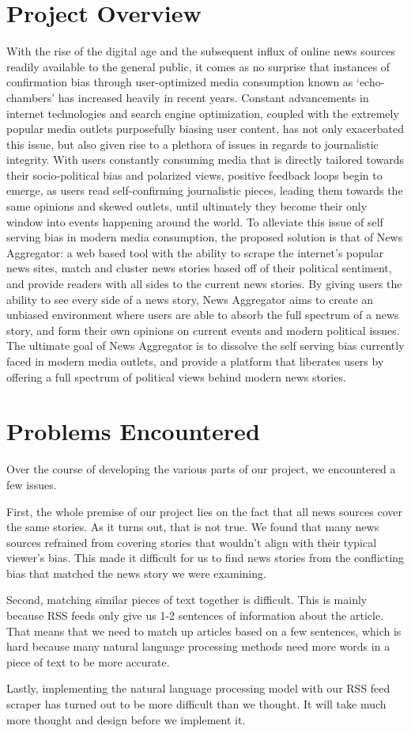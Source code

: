\documentclass[onecolumn, draftclsnofoot,10pt, compsoc]{IEEEtran}
\begin{document}
\section{Project Overview}
With the rise of the digital age and the subsequent influx of online news sources readily available to the general
public, it comes as no surprise that instances of confirmation bias through user-optimized media consumption known
as ‘echo-chambers’ has increased heavily in recent years. Constant advancements in internet technologies and search
engine optimization, coupled with the extremely popular media outlets purposefully biasing user content, has not only
exacerbated this issue, but also given rise to a plethora of issues in regards to journalistic integrity. With users constantly
consuming media that is directly tailored towards their socio-political bias and polarized views, positive feedback loops
begin to emerge, as users read self-confirming journalistic pieces, leading them towards the same opinions and skewed
outlets, until ultimately they become their only window into events happening around the world. To alleviate this issue
of self serving bias in modern media consumption, the proposed solution is that of News Aggregator: a web based tool
with the ability to scrape the internet’s popular news sites, match and cluster news stories based off of their political
sentiment, and provide readers with all sides to the current news stories. By giving users the ability to see every side of
a news story, News Aggregator aims to create an unbiased environment where users are able to absorb the full spectrum
of a news story, and form their own opinions on current events and modern political issues. The ultimate goal of News
Aggregator is to dissolve the self serving bias currently faced in modern media outlets, and provide a platform that
liberates users by offering a full spectrum of political views behind modern news stories.

\section{Problems Encountered}
Over the course of developing the various parts of our project, we encountered a few issues. \par
First, the whole premise of our project lies on the fact that all news sources cover the same stories. As it turns out, that is not true. We found that many news sources refrained from covering stories that wouldn't align with their typical viewer's bias. This made it difficult for us to find news stories from the conflicting bias that matched the news story we were examining. \par
Second, matching similar pieces of text together is difficult. This is mainly because RSS feeds only give us 1-2 sentences of information about the article. That means that we need to match up articles based on a few sentences, which is hard because many natural language processing methods need more words in a piece of text to be more accurate. \par 
Lastly, implementing the natural language processing model with our RSS feed scraper has turned out to be more difficult than we thought. It will take much more thought and design before we implement it.
\end{document}
